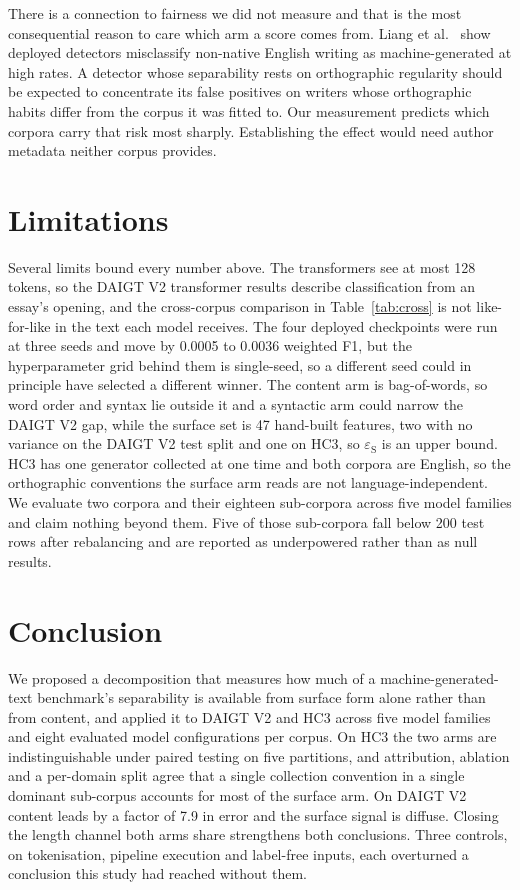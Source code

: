 There is a connection to fairness we did not measure and that is the most consequential reason to care which arm a score comes from. Liang et al.~\cite{Liang2023gpt} show deployed detectors misclassify non-native English writing as machine-generated at high rates. A detector whose separability rests on orthographic regularity should be expected to concentrate its false positives on writers whose orthographic habits differ from the corpus it was fitted to. Our measurement predicts which corpora carry that risk most sharply. Establishing the effect would need author metadata neither corpus provides.

\section{Limitations}

Several limits bound every number above. The transformers see at most 128 tokens, so the DAIGT V2 transformer results describe classification from an essay's opening, and the cross-corpus comparison in Table~\ref{tab:cross} is not like-for-like in the text each model receives. The four deployed checkpoints were run at three seeds and move by 0.0005 to 0.0036 weighted F1, but the hyperparameter grid behind them is single-seed, so a different seed could in principle have selected a different winner. The content arm is bag-of-words, so word order and syntax lie outside it and a syntactic arm could narrow the DAIGT V2 gap, while the surface set is 47 hand-built features, two with no variance on the DAIGT V2 test split and one on HC3, so $\varepsilon_{\mathrm{S}}$ is an upper bound. HC3 has one generator collected at one time and both corpora are English, so the orthographic conventions the surface arm reads are not language-independent. We evaluate two corpora and their eighteen sub-corpora across five model families and claim nothing beyond them. Five of those sub-corpora fall below 200 test rows after rebalancing and are reported as underpowered rather than as null results.

\section{Conclusion}

We proposed a decomposition that measures how much of a machine-generated-text benchmark's separability is available from surface form alone rather than from content, and applied it to DAIGT V2 and HC3 across five model families and eight evaluated model configurations per corpus. On HC3 the two arms are indistinguishable under paired testing on five partitions, and attribution, ablation and a per-domain split agree that a single collection convention in a single dominant sub-corpus accounts for most of the surface arm. On DAIGT V2 content leads by a factor of 7.9 in error and the surface signal is diffuse. Closing the length channel both arms share strengthens both conclusions. Three controls, on tokenisation, pipeline execution and label-free inputs, each overturned a conclusion this study had reached without them.

